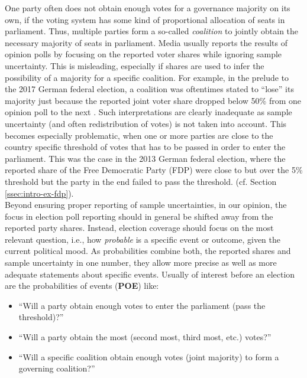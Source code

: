 \documentclass[smallcondensed]{svjour3}     %
\begin{document}
One party often does not obtain enough votes for a governance majority on its own,
if the voting system has some kind of proportional allocation of seats in
parliament. Thus, multiple parties form
a so-called \emph{coalition} to jointly obtain the necessary majority of seats
in parliament. Media usually reports the results of opinion polls by focusing
on the reported voter shares while ignoring sample uncertainty. This is misleading,
especially if shares are used to infer the possibility of a majority for
a specific coalition. For example, in the prelude to the 2017 German federal election,
a coalition was oftentimes stated to ``lose'' its majority just because the reported joint
voter share dropped below 50\% from one opinion poll to the next \citep[cf.][]{umfrage_2017}.
Such interpretations are clearly inadequate as sample uncertainty
(and often redistribution of votes) is not taken into account. This becomes especially
problematic, when one or more parties are close to the country specific threshold
of votes that has to be passed in order to enter the parliament. This was the case
in the 2013 German federal election, where the reported share of the Free Democratic
Party (FDP) were close to but over the 5\% threshold but the party in the end failed
to pass the threshold. (cf. Section \ref{ssec:intro-ex-fdp}).\\


Beyond ensuring proper reporting of sample uncertainties, in our opinion, the
focus in election poll reporting should in general be shifted away from the
reported party shares. Instead, election coverage should focus on the most relevant
question, i.e., how {\it probable} is a specific event or outcome, given
the current political mood. As probabilities combine both, the reported shares and
sample uncertainty in one number, they allow more precise as well as more adequate
statements about specific events. Usually of interest before an election are the
probabilities of events (\textbf{POE}) like:

\begin{itemize}
  \item ``Will a party obtain enough votes to enter the parliament (pass the threshold)?''
  \item ``Will a party obtain the most (second most, third most, etc.) votes?''
  \item ``Will a specific coalition obtain enough votes (joint majority) to form a governing coalition?''
\end{itemize}
\end{document}
